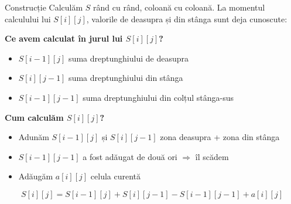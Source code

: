 \documentclass{beamer}
\begin{document}
\begin{frame}[shrink]{Construcție}
  Calculăm $S$ rând cu rând, coloană cu coloană. La momentul calculului lui $S[i][j]$, valorile de deasupra și din stânga sunt deja cunoscute:

  \smallskip
  \textbf{Ce avem calculat în jurul lui $S[i][j]$?}
  \begin{itemize}
    \item $S[i{-}1][j]$ \textemdash{} suma dreptunghiului de deasupra
    \item $S[i][j{-}1]$ \textemdash{} suma dreptunghiului din stânga
    \item $S[i{-}1][j{-}1]$ \textemdash{} suma dreptunghiului din colțul stânga-sus
  \end{itemize}

  \smallskip
  \textbf{Cum calculăm $S[i][j]$?}
  \begin{itemize}
    \item Adunăm $S[i{-}1][j]$ și $S[i][j{-}1]$ \textemdash{} zona deasupra + zona din stânga
    \item $S[i{-}1][j{-}1]$ a fost adăugat de două ori $\Rightarrow$ îl scădem
    \item Adăugăm $a[i][j]$ \textemdash{} celula curentă
  \end{itemize}

  \[S[i][j] = S[i{-}1][j] + S[i][j{-}1] - S[i{-}1][j{-}1] + a[i][j]\]
\end{frame}
\end{document}
